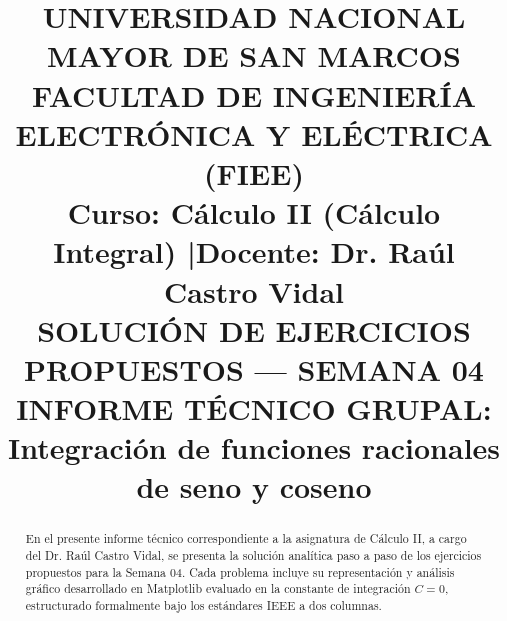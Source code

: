 \documentclass[conference]{IEEEtran}
\newcommand{\NumeroSemana}{04}
\newcommand{\TemaSemana}{Integración de funciones racionales de seno y coseno}
\begin{document}
	
	\title{UNIVERSIDAD NACIONAL MAYOR DE SAN MARCOS\\
		\Large FACULTAD DE INGENIERÍA ELECTRÓNICA Y ELÉCTRICA (FIEE)\\
		\vspace{0.3cm}
		\large \textbf{Curso:} Cálculo II (Cálculo Integral) \quad|\quad \textbf{Docente:} Dr. Raúl Castro Vidal\\
		\vspace{0.4cm}
		\huge SOLUCIÓN DE EJERCICIOS PROPUESTOS --- SEMANA \NumeroSemana\\
		\LARGE INFORME TÉCNICO GRUPAL: \TemaSemana}
	
	\author{
		\and
		\and
		\vspace{0.4cm}
		\and
		\and
		\and
	}
	
	\maketitle
	
	\begin{abstract}
		En el presente informe técnico correspondiente a la asignatura de Cálculo II, a cargo del Dr. Raúl Castro Vidal, se presenta la solución analítica paso a paso de los ejercicios propuestos para la Semana \NumeroSemana. Cada problema incluye su representación y análisis gráfico desarrollado en Matplotlib evaluado en la constante de integración $C=0$, estructurado formalmente bajo los estándares IEEE a dos columnas.
	\end{abstract}
	
\end{document}
